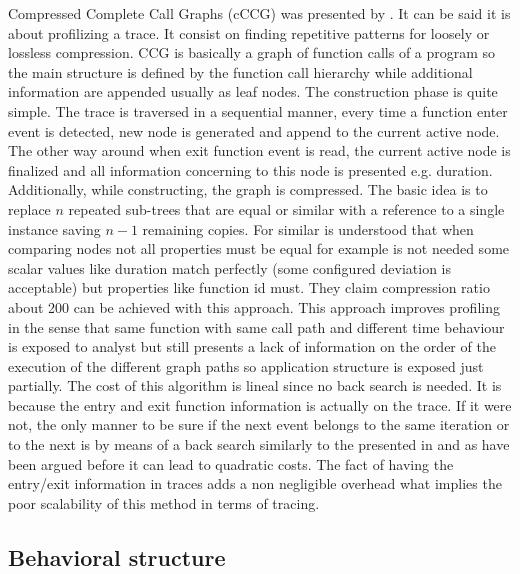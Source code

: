 Compressed Complete Call Graphs (cCCG) was
presented by \cite{knupfer2005construction}. It can be said it is about 
profilizing a trace. It consist on finding repetitive 
patterns for loosely or lossless compression.  
CCG is basically a graph of function calls of a program so the main structure is
defined by the function call hierarchy while additional information are appended
usually as leaf nodes. The construction phase is quite simple. The trace is
traversed in a sequential manner, every time a function enter event is detected,
new node is generated and append to the current active node. The
other way around when exit function event is read, the current active node is
finalized and all information concerning to this node is presented e.g.
duration. Additionally, while constructing, the graph is compressed. The basic 
idea is to replace $n$ repeated sub-trees that are equal or similar with a 
reference to a single instance saving $n-1$ remaining copies. For similar is
understood that when comparing nodes not all properties must be equal for
example is not needed some scalar values like duration match perfectly (some
configured deviation is acceptable) but properties like function id must. They
claim compression ratio about 200 can be achieved with this approach.
This approach improves profiling in the sense that same function with same call
path and different time behaviour is exposed to analyst but still presents a lack 
of information on the order of the execution of the different graph paths so
application structure is exposed just partially. The cost of this algorithm is 
lineal since no back search is needed. It is
because the entry and exit function information is actually on the trace. If it
were not, the only manner to be sure if the next event belongs to the same
iteration or to the next is by means of a back search similarly to the presented
in \cite{noeth2009scalatrace} and as have been argued before it can lead to
quadratic costs. The fact of having the entry/exit information in traces adds a
non negligible overhead what implies the poor scalability of this
method in terms of tracing.


\subsection{Behavioral structure}\label{ss:behavioral_structure}

